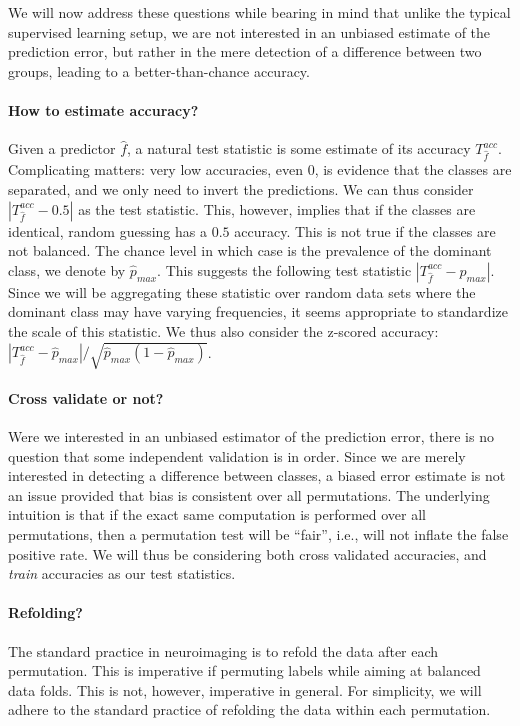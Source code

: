 \documentclass[12pt,a4paper]{article}
\newcommand{\hyp}{f} %
\newcommand{\hypEstim}{\hat{\hyp}} %
\newcommand{\acc}{T^{acc}}
\newcommand{\dominant}{\hat{p}_{max}}
\begin{document}
We will now address these questions while bearing in mind that unlike the typical supervised learning setup, we are not interested in an unbiased estimate of the prediction error, but rather in the mere detection of a difference between two groups, leading to a better-than-chance accuracy. 

\paragraph{How to estimate accuracy?}
Given a predictor $\hypEstim$, a natural test statistic is some estimate of its accuracy $\acc_{\hypEstim}$.
Complicating matters: very low accuracies, even $0$, is evidence that the classes are separated, and we only need to invert the predictions. 
We can thus consider $|\acc_{\hypEstim}-0.5|$ as the test statistic.
This, however, implies that if the classes are identical, random guessing has a $0.5$ accuracy. This is not true if the classes are not balanced. 
The chance level in which case is the prevalence of the dominant class, we denote by $\dominant$.
This suggests the following test statistic $|\acc_{\hypEstim}-\dominant|$.
Since we will be aggregating these statistic over random data sets where the dominant class may have varying frequencies, it seems appropriate to standardize the scale of this statistic. 
We thus also consider the z-scored accuracy: $|\acc_{\hypEstim}-\dominant|/\sqrt{\dominant(1-\dominant)}$.


\paragraph{Cross validate or not?}
Were we interested in an unbiased estimator of the prediction error, there is no question that some independent validation is in order. 
Since we are merely interested in detecting a difference between classes, a biased error estimate is not an issue provided that bias is consistent over all permutations. 
The underlying intuition is that if the exact same computation is performed over all permutations, then a permutation test will be ``fair'', i.e., will not inflate the false positive rate. 
We will thus be considering both cross validated accuracies, and \emph{train} accuracies as our test statistics. 


\paragraph{Refolding?}
The standard practice in neuroimaging is to refold the data after each permutation.
This is imperative if permuting labels while aiming at balanced data folds. 
This is not, however, imperative in general. 
For simplicity, we will adhere to the standard practice of refolding the data within each permutation.
\end{document}
